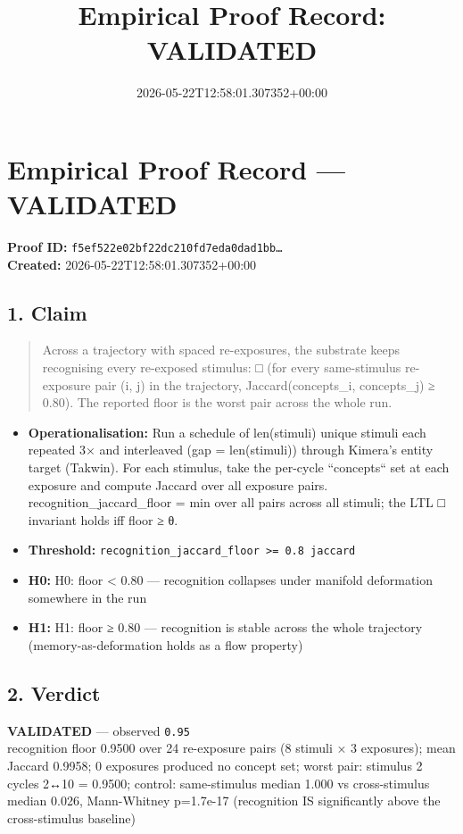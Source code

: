 \documentclass{article}
\title{Empirical Proof Record: VALIDATED}
\date{2026-05-22T12:58:01.307352+00:00}
\begin{document}
\maketitle
\section*{Empirical Proof Record --- \textcolor{validated}{\textbf{VALIDATED}}}
\textbf{Proof ID:} \texttt{f5ef522e02bf22dc210fd7eda0dad1bb\dots}\\
\textbf{Created:} 2026-05-22T12:58:01.307352+00:00
\subsection*{1. Claim}
\begin{quote}Across a trajectory with spaced re-exposures, the substrate keeps recognising every re-exposed stimulus: □ (for every same-stimulus re-exposure pair (i, j) in the trajectory, Jaccard(concepts\_i, concepts\_j) ≥ 0.80). The reported floor is the worst pair across the whole run.\end{quote}
\begin{itemize}
\item \textbf{Operationalisation:} Run a schedule of len(stimuli) unique stimuli each repeated 3× and interleaved (gap = len(stimuli)) through Kimera's entity target (Takwin). For each stimulus, take the per-cycle ``concepts`` set at each exposure and compute Jaccard over all exposure pairs. recognition\_jaccard\_floor = min over all pairs across all stimuli; the LTL □ invariant holds iff floor ≥ θ.
\item \textbf{Threshold:} \texttt{recognition\_jaccard\_floor >= 0.8 jaccard}
\item \textbf{H0:} H0: floor < 0.80 — recognition collapses under manifold deformation somewhere in the run
\item \textbf{H1:} H1: floor ≥ 0.80 — recognition is stable across the whole trajectory (memory-as-deformation holds as a flow property)
\end{itemize}
\subsection*{2. Verdict}
\textcolor{validated}{\textbf{VALIDATED}} --- observed \texttt{0.95}\\
recognition floor 0.9500 over 24 re-exposure pairs (8 stimuli × 3 exposures); mean Jaccard 0.9958; 0 exposures produced no concept set; worst pair: stimulus 2 cycles 2↔10 = 0.9500; control: same-stimulus median 1.000 vs cross-stimulus median 0.026, Mann-Whitney p=1.7e-17 (recognition IS significantly above the cross-stimulus baseline)
\end{document}
